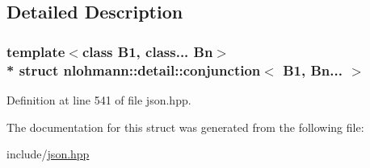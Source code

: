 \subsection{Detailed Description}
\subsubsection*{template$<$class B1, class... Bn$>$\\*
struct nlohmann\+::detail\+::conjunction$<$ B1, Bn... $>$}



Definition at line 541 of file json.\+hpp.



The documentation for this struct was generated from the following file\+:\begin{DoxyCompactItemize}
\item 
include/\hyperlink{json_8hpp}{json.\+hpp}\end{DoxyCompactItemize}
